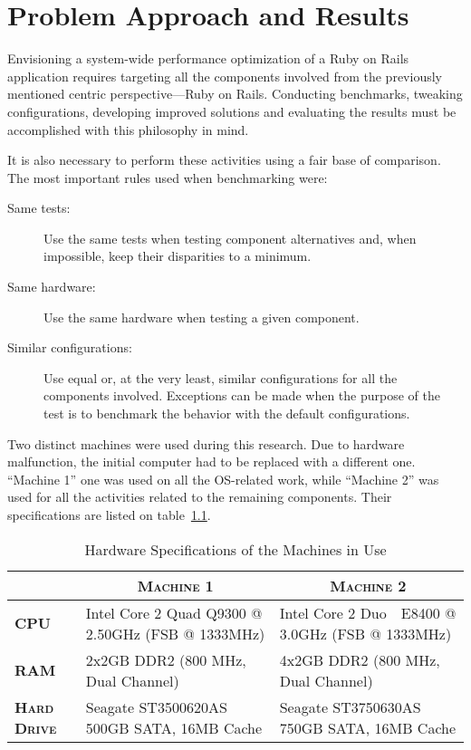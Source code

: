 \chapter{Problem Approach and Results} %
\label{cha:problem_approach_and_results}

Envisioning a system-wide performance optimization of a Ruby on Rails application requires targeting all the components involved from the previously mentioned centric perspective---Ruby on Rails. Conducting benchmarks, tweaking configurations, developing improved solutions and evaluating the results must be accomplished with this philosophy in mind. 

It is also necessary to perform these activities using a fair base of comparison. The most important rules used when benchmarking were:
\begin{description}
  \item[Same tests:] Use the same tests when testing component alternatives and, when impossible, keep their disparities to a minimum.
  \item[Same hardware:] Use the same hardware when testing a given component.
  \item[Similar configurations:] Use equal or, at the very least, similar configurations for all the components involved. Exceptions can be made when the purpose of the test is to benchmark the behavior with the default configurations.
\end{description}

Two distinct machines were used during this research. Due to hardware malfunction, the initial computer had to be replaced with a different one. ``Machine 1'' one was used on all the OS-related work, while ``Machine 2'' was used for all the activities related to the remaining components. Their specifications are listed on table~\ref{tab:machines_hardware_specification}.
\begin{table}[ht]
  \centering
  \caption{Hardware Specifications of the Machines in Use}
  \label{tab:machines_hardware_specification}
  
  \begin{tabular}{p{}|p{}|p{}}
    & \multicolumn{1}{c|}{\textbf{\textsc{Machine 1}}} & \multicolumn{1}{c}{\textbf{\textsc{Machine 2}}} \\ \hline

    \textbf{\textsc{CPU}} & Intel Core 2 Quad Q9300 @ 2.50GHz (FSB @ 1333MHz) & Intel Core 2 Duo ~\,E8400 @ 3.0GHz (FSB @ 1333MHz) \\ \hline
    \textbf{\textsc{RAM}} & 2x2GB DDR2 (800 MHz, Dual Channel) & 4x2GB DDR2 (800 MHz, Dual Channel) \\ \hline
    \textbf{\textsc{Hard Drive}} & Seagate ST3500620AS 500GB SATA, 16MB Cache & Seagate ST3750630AS 750GB SATA, 16MB Cache \\
  
  \end{tabular}
\end{table}

